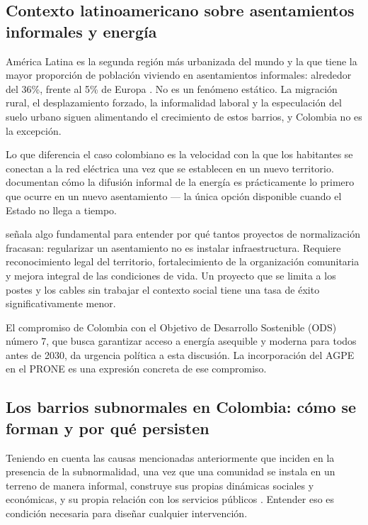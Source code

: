 \subsection{Contexto latinoamericano sobre asentamientos informales y energía}
\label{subsec:contexto_global}

América Latina es la segunda región más urbanizada del mundo y la que tiene la mayor proporción de población viviendo en asentamientos informales: alrededor del 36\%, frente al 5\% de Europa \parencite{AgenciaIberoamericana2017}. No es un fenómeno estático. La migración rural, el desplazamiento forzado, la informalidad laboral y la especulación del suelo urbano siguen alimentando el crecimiento de estos barrios, y Colombia no es la excepción.

Lo que diferencia el caso colombiano es la velocidad con la que los habitantes se conectan a la red eléctrica una vez que se establecen en un nuevo territorio. \textcite{MosqueraNoguera2005} documentan cómo la difusión informal de la energía es prácticamente lo primero que ocurre en un nuevo asentamiento — la única opción disponible cuando el Estado no llega a tiempo.

\textcite{Fernandes2011} señala algo fundamental para entender por qué tantos proyectos de normalización fracasan: regularizar un asentamiento no es instalar infraestructura. Requiere reconocimiento legal del territorio, fortalecimiento de la organización comunitaria y mejora integral de las condiciones de vida. Un proyecto que se limita a los postes y los cables sin trabajar el contexto social tiene una tasa de éxito significativamente menor.

El compromiso de Colombia con el Objetivo de Desarrollo Sostenible (ODS) número 7, que busca garantizar acceso a energía asequible y moderna para todos antes de 2030, da urgencia política a esta discusión. La incorporación del AGPE en el PRONE es una expresión concreta de ese compromiso.

\subsection{Los barrios subnormales en Colombia: cómo se forman y por qué persisten}
\label{subsec:bs_colombia}

Teniendo en cuenta las causas mencionadas anteriormente que inciden en la presencia de la subnormalidad, una vez que una comunidad se instala en un terreno de manera informal, construye sus propias dinámicas sociales y económicas, y su propia relación con los servicios públicos \parencite{UribeCastro2011}. Entender eso es condición necesaria para diseñar cualquier intervención.

